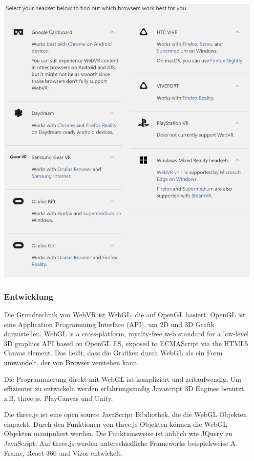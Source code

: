  \includegraphics[width=\textwidth]{images/supportedBrowsers.png}
 
  \subsubsection{Entwicklung}
 Die Grundtechnik von WebVR ist WebGL, die auf OpenGL basiert. OpenGL ist eine Application Programming Interface (API), um 2D und 3D Grafik darzustellen. \glqq WebGL is a cross-platform, royalty-free web standard for a low-level 3D graphics API based on OpenGL ES, exposed to ECMAScript via the HTML5 Canvas element. \grqq \citep{23} Das heißt, dass die Grafiken durch WebGL als ein Form umwandelt, der von Browser verstehen kann. 
 
 Die Programmierung direkt mit WebGL ist kompliziert und zeitaufwendig. Um effizienter zu entwickeln werden erfahrungsmäßig Javascript 3D Engines benutzt, z.B. three.js, PlayCanvas und Unity.
 
 Die three.js ist eine open source JavaScript Bibiliothek, die die WebGL Objekten einpackt. Durch den Funktionen von three.js Objekten können die WebGL Objekten manipuliert werden. Die Funktionsweise ist änhlich wie JQuery zu JavaScript. Auf three.js werden unterschiedliche Frameworks beispielsweise A-Frame, React 360 und Vizor entwickelt.
 

